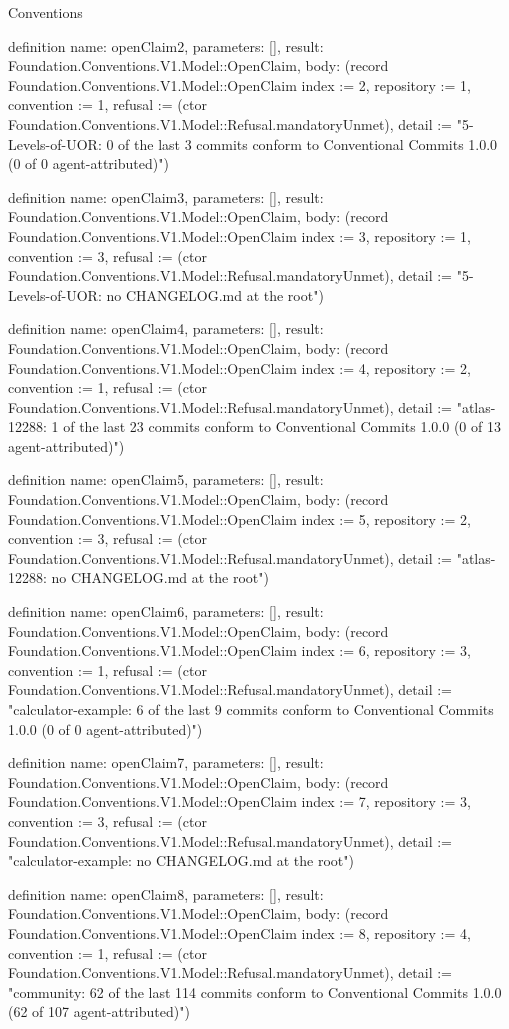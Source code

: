 \begin{lexlean}{Conventions}
\begin{semanticmodule}
definition{
  name: openClaim2,
  parameters: [],
  result: Foundation.Conventions.V1.Model::OpenClaim,
  body: (record Foundation.Conventions.V1.Model::OpenClaim {index := 2, repository := 1, convention := 1, refusal := (ctor Foundation.Conventions.V1.Model::Refusal.mandatoryUnmet), detail := "5-Levels-of-UOR: 0 of the last 3 commits conform to Conventional Commits 1.0.0 (0 of 0 agent-attributed)"})
}

definition{
  name: openClaim3,
  parameters: [],
  result: Foundation.Conventions.V1.Model::OpenClaim,
  body: (record Foundation.Conventions.V1.Model::OpenClaim {index := 3, repository := 1, convention := 3, refusal := (ctor Foundation.Conventions.V1.Model::Refusal.mandatoryUnmet), detail := "5-Levels-of-UOR: no CHANGELOG.md at the root"})
}

definition{
  name: openClaim4,
  parameters: [],
  result: Foundation.Conventions.V1.Model::OpenClaim,
  body: (record Foundation.Conventions.V1.Model::OpenClaim {index := 4, repository := 2, convention := 1, refusal := (ctor Foundation.Conventions.V1.Model::Refusal.mandatoryUnmet), detail := "atlas-12288: 1 of the last 23 commits conform to Conventional Commits 1.0.0 (0 of 13 agent-attributed)"})
}

definition{
  name: openClaim5,
  parameters: [],
  result: Foundation.Conventions.V1.Model::OpenClaim,
  body: (record Foundation.Conventions.V1.Model::OpenClaim {index := 5, repository := 2, convention := 3, refusal := (ctor Foundation.Conventions.V1.Model::Refusal.mandatoryUnmet), detail := "atlas-12288: no CHANGELOG.md at the root"})
}

definition{
  name: openClaim6,
  parameters: [],
  result: Foundation.Conventions.V1.Model::OpenClaim,
  body: (record Foundation.Conventions.V1.Model::OpenClaim {index := 6, repository := 3, convention := 1, refusal := (ctor Foundation.Conventions.V1.Model::Refusal.mandatoryUnmet), detail := "calculator-example: 6 of the last 9 commits conform to Conventional Commits 1.0.0 (0 of 0 agent-attributed)"})
}

definition{
  name: openClaim7,
  parameters: [],
  result: Foundation.Conventions.V1.Model::OpenClaim,
  body: (record Foundation.Conventions.V1.Model::OpenClaim {index := 7, repository := 3, convention := 3, refusal := (ctor Foundation.Conventions.V1.Model::Refusal.mandatoryUnmet), detail := "calculator-example: no CHANGELOG.md at the root"})
}

definition{
  name: openClaim8,
  parameters: [],
  result: Foundation.Conventions.V1.Model::OpenClaim,
  body: (record Foundation.Conventions.V1.Model::OpenClaim {index := 8, repository := 4, convention := 1, refusal := (ctor Foundation.Conventions.V1.Model::Refusal.mandatoryUnmet), detail := "community: 62 of the last 114 commits conform to Conventional Commits 1.0.0 (62 of 107 agent-attributed)"})
}


\end{semanticmodule}
\end{lexlean}
